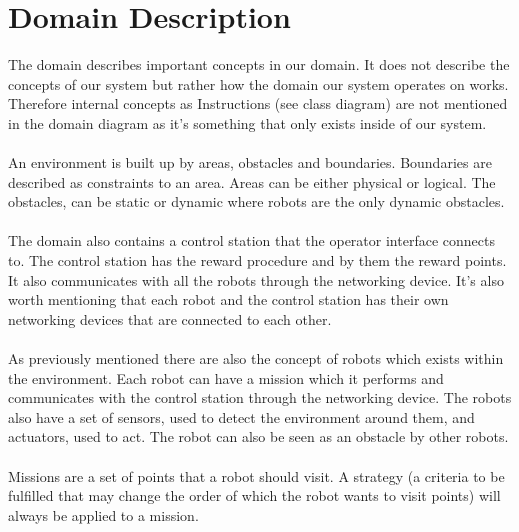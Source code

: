 \section{Domain Description}
The domain describes important concepts in our domain. 
It does not describe the concepts of our system but rather how the domain our system operates on works. 
Therefore internal concepts as Instructions (see class diagram) are not mentioned in the domain diagram as it's something that only exists inside of our system.
\\ \\
An environment is built up by areas, obstacles and boundaries.
Boundaries are described as constraints to an area. Areas can be either physical or logical.
The obstacles, can be static or dynamic where robots are the only dynamic obstacles. 
\\ \\
The domain also contains a control station that the operator interface connects to.
The control station has the reward procedure and by them the reward points.
It also communicates with all the robots through the networking device. It's also worth mentioning that each robot and the control station has their own networking devices that are connected to each other.
\\ \\
As previously mentioned there are also the concept of robots which exists within the environment.
Each robot can have a mission which it performs and communicates with the control station through the networking device. 
The robots also have a set of sensors, used to detect the environment around them, and actuators, used to act. The robot can also be seen as an obstacle by other robots.
\\ \\
Missions are a set of points that a robot should visit. A strategy (a criteria to be fulfilled that may change the order of which the robot wants to visit points) will always be applied to a mission.
